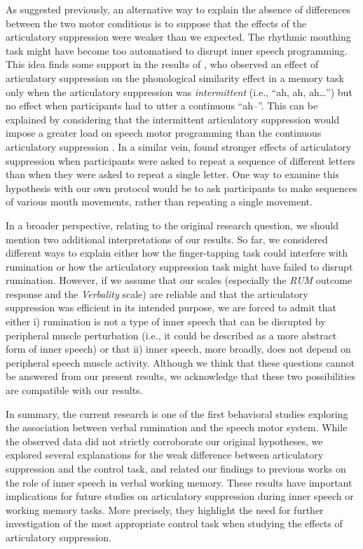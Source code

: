 \documentclass[12pt,]{book}
\theoremstyle{definition}
\theoremstyle{definition}
\theoremstyle{definition}
\theoremstyle{remark}
\begin{document}
As suggested previously, an alternative way to explain the absence of
differences between the two motor conditions is to suppose that the
effects of the articulatory suppression were weaker than we expected.
The rhythmic mouthing task might have become too automatised to disrupt
inner speech programming. This idea finds some support in the results of
\citet{Saito1997}, who observed an effect of articulatory suppression on
the phonological similarity effect in a memory task only when the
articulatory suppression was \emph{intermittent} (i.e., ``ah, ah,
ah\ldots{}'') but no effect when participants had to utter a continuous
``ah--''. This can be explained by considering that the intermittent
articulatory suppression would impose a greater load on speech motor
programming than the continuous articulatory suppression \citep[page
569]{Saito1997}. In a similar vein, \citet{Macken1995} found stronger
effects of articulatory suppression when participants were asked to
repeat a sequence of different letters than when they were asked to
repeat a single letter. One way to examine this hypothesis with our own
protocol would be to ask participants to make sequences of various mouth
movements, rather than repeating a single movement.

In a broader perspective, relating to the original research question, we
should mention two additional interpretations of our results. So far, we
considered different ways to explain either how the finger-tapping task
could interfere with rumination or how the articulatory suppression task
might have failed to disrupt rumination. However, if we assume that our
scales (especially the \emph{RUM} outcome response and the
\emph{Verbality} scale) are reliable and that the articulatory
suppression was efficient in its intended purpose, we are forced to
admit that either i) rumination is not a type of inner speech that can
be disrupted by peripheral muscle perturbation (i.e., it could be
described as a more abstract form of inner speech) or that ii) inner
speech, more broadly, does not depend on peripheral speech muscle
activity. Although we think that these questions cannot be answered from
our present results, we acknowledge that these two possibilities are
compatible with our results.

In summary, the current research is one of the first behavioral studies
exploring the association between verbal rumination and the speech motor
system. While the observed data did not strictly corroborate our
original hypotheses, we explored several explanations for the weak
difference between articulatory suppression and the control task, and
related our findings to previous works on the role of inner speech in
verbal working memory. These results have important implications for
future studies on articulatory suppression during inner speech or
working memory tasks. More precisely, they highlight the need for
further investigation of the most appropriate control task when studying
the effects of articulatory suppression.
\end{document}
